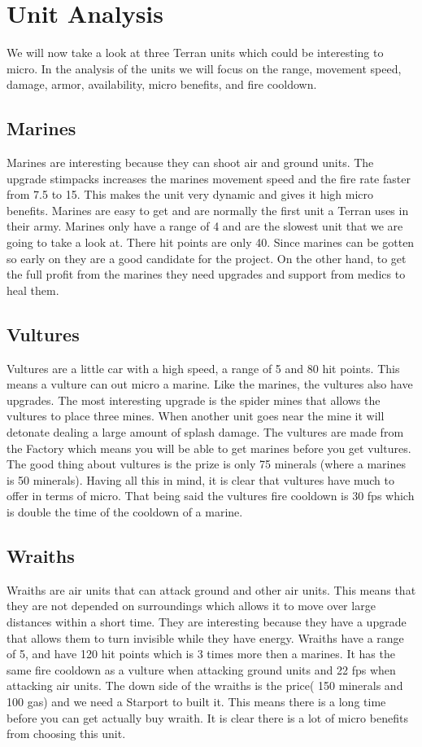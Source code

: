 \section{Unit Analysis}
We will now take a look at three Terran units which could be interesting to micro. In the analysis of the units we will
focus on the range, movement speed, damage, armor, availability, micro benefits, and fire cooldown. 

\subsection{Marines}
Marines are interesting because they can shoot air and ground units. The upgrade stimpacks increases the marines movement speed and the fire rate
faster from 7.5 to 15. This makes the unit very dynamic and gives it high micro benefits. Marines are easy to get and are normally the first unit a Terran uses in
their army. Marines only have a range of 4 and are the slowest unit that we are going to take a look at. There
hit points are only 40. Since marines can be gotten so early on they are a good candidate for the project. On the other hand, to get the full profit from the
marines they need upgrades and support from medics to heal them. 

\subsection{Vultures}
Vultures are a little car with a high speed, a range of 5 and 80 hit points. This means a vulture can out micro a marine. Like the marines, the
vultures also have upgrades. The most interesting upgrade is the spider mines that allows the vultures to place three mines. When another unit goes near the mine it will detonate dealing a large amount of splash damage. The vultures are made
from the Factory which means you will be able to get marines before you get vultures. The good thing about vultures is the prize is only 75 minerals (where
a marines is 50 minerals). Having all this in mind, it is clear that vultures have much to offer in terms of micro.
That being said the vultures fire cooldown is 30 fps which is double the time of the cooldown of a marine.\cite{wiki_vulture}

\subsection{Wraiths}
Wraiths are air units that can attack ground and other air units. This means that they are not depended on surroundings which allows it
to move over large distances within a short time. They are interesting because they have a upgrade that allows them to turn invisible while they have energy. Wraiths 
have a range of 5, and have 120 hit points which is 3 times more then a marines. It has the same fire cooldown
as a vulture when attacking ground units and 22 fps when attacking air units.  
The down side of the wraiths is the price( 150 minerals and 100 gas) and we need a Starport to built it. This means
there is a long time before you can get actually buy wraith. It is clear there is a lot of micro benefits from choosing this unit. 

